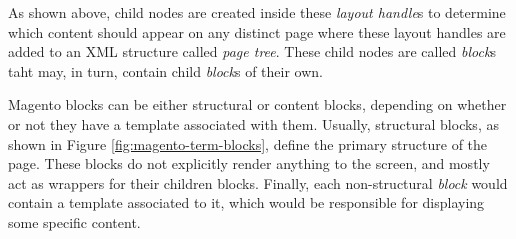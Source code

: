 As shown above, child nodes are created inside these \textit{layout handle}s to determine which content should appear on any distinct page where these layout handles are added to an XML structure called \textit{page tree}. These child nodes are called \textit{block}s taht may, in turn, contain child \textit{block}s of their own. 

Magento blocks can be either structural or content blocks, depending on whether or not they have a template associated with them.
Usually, structural blocks, as shown in Figure \ref{fig:magento-term-blocks}, define the primary structure of the page. These blocks do not explicitly render anything to the screen, and mostly act as wrappers for their children blocks.
Finally, each non-structural \textit{block} would contain a template associated to it, which would be responsible for displaying some specific content.

